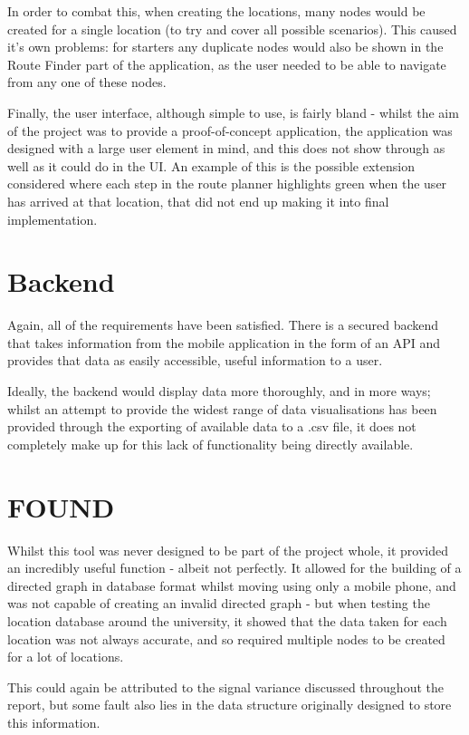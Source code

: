 \documentclass[11pt]{informatics-report}
\begin{document}
In order to combat this, when creating the locations, many nodes would be created for a single location (to try and cover all possible scenarios). This caused it's own problems: for starters any duplicate nodes would also be shown in the Route Finder part of the application, as the user needed to be able to navigate from any one of these nodes. 

Finally, the user interface, although simple to use, is fairly bland - whilst the aim of the project was to provide a proof-of-concept application, the application was designed with a large user element in mind, and this does not show through as well as it could do in the UI. An example of this is the possible extension considered where each step in the route planner highlights green when the user has arrived at that location, that did not end up making it into final implementation.

\section{Backend}

Again, all of the requirements have been satisfied. There is a secured backend that takes information from the mobile application in the form of an API and provides that data as easily accessible, useful information to a user. 

Ideally, the backend would display data more thoroughly, and in more ways; whilst an attempt to provide the widest range of data visualisations has been provided through the exporting of available data to a .csv file, it does not completely make up for this lack of functionality being directly available.

\section{FOUND}

Whilst this tool was never designed to be part of the project whole, it provided an incredibly useful function - albeit not perfectly. It allowed for the building of a directed graph in database format whilst moving using only a mobile phone, and was not capable of creating an invalid directed graph - but when testing the location database around the university, it showed that the data taken for each location was not always accurate, and so required multiple nodes to be created for a lot of locations.

This could again be attributed to the signal variance discussed throughout the report, but some fault also lies in the data structure originally designed to store this information.
\end{document}
